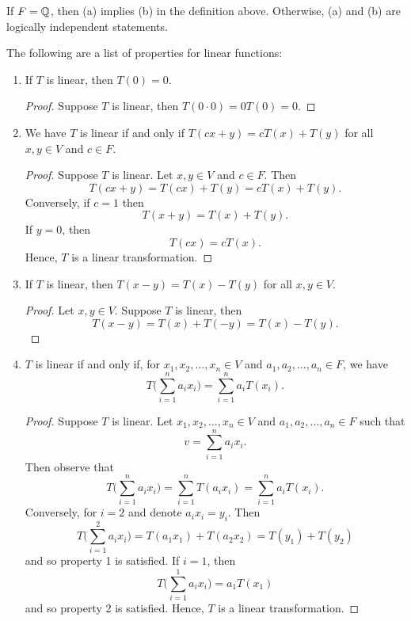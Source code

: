 \begin{remark}
    If \( F = \mathbb{Q}   \), then (a) implies (b) in the definition above. Otherwise, (a) and (b) are logically independent statements.  
\end{remark}
The following are a list of properties for linear functions:
\begin{enumerate}
    \item If \( T  \) is linear, then \( T(0) = 0  \).
        \begin{proof}
        Suppose \( T  \) is linear, then \( T(0 \cdot 0 ) = 0 T(0) = 0  \).
        \end{proof}
    \item \label{Second Property of Linearity} We have \( T  \) is linear if and only if \( T(cx+y) = cT(x) + T(y)  \) for all \( x,y \in V  \) and \( c \in F  \).
        \begin{proof}
        Suppose \( T  \) is linear. Let \( x,y \in V  \) and \( c \in F  \). Then 
        \[  T(cx+y) = T(cx) + T(y) = cT(x) + T(y). \]
        Conversely, if \( c = 1  \) then 
        \[  T(x + y) = T(x) + T(y). \]
        If  \( y = 0  \), then 
        \[ T(cx) = cT(x).  \]
        Hence, \( T  \) is a linear transformation.
        \end{proof}
    \item If \( T  \) is linear, then \( T(x-y) = T(x) - T(y)  \) for all \( x,y \in V  \).
        \begin{proof}
        Let \( x,y \in V  \). Suppose \( T  \) is linear, then 
        \[ T(x - y) = T(x) + T(-y) = T(x) - T(y).  \]
        \end{proof}
    \item \( T  \) is linear if and only if, for \( x_{1}, x_{2} , \dots, x_{n} \in V  \) and \( a_{1}, a_{2}, \dots, a_{n} \in F  \), 
        we have
        \[  T \Big(  \sum_{ i=1 }^{ n } a_{i} x_{i}  \Big) = \sum_{ i=1 }^{ n } a_{i} T(x_{i}). \]
        \begin{proof}
        Suppose \( T  \) is linear. Let \( x_{1}, x_{2}, \dots, x_{n} \in V  \) and \( a_{1}, a_{2}, \dots, a_{n} \in F  \) such that
        \[  v = \sum_{ i=1 }^{ n } a_{i} x_{i}. \]
        Then observe that 
        \[
            T \Big( \sum_{ i=1 }^{ n } a_{i} x_{i} \Big) = \sum_{ i=1 }^{ n } T( a_{i} x_{i}) 
                                                         = \sum_{ i=1 }^{ n } a_{i} T(x_{i}).
        \]
        Conversely, for \( i = 2  \) and denote \( a_{i} x_{i} = y_{i} \). Then
        \[  T\Big(\sum_{ i=1 }^{ 2 } a_{i} x_{i} \Big) = T(a_{1} x_{1}) + T(a_{2} x_{2}) = T(y_{1}) + T(y_{2})  \]  
        and so property 1 is satisfied. 
        If \( i = 1  \), then 
        \[  T \Big( \sum_{ i=1 }^{ 1 } a_{i}x_{i}  \Big) = a_{1} T(x_{1}) \]
        and so property 2 is satisfied. Hence, \( T  \) is a linear transformation.
        \end{proof}
\end{enumerate}

